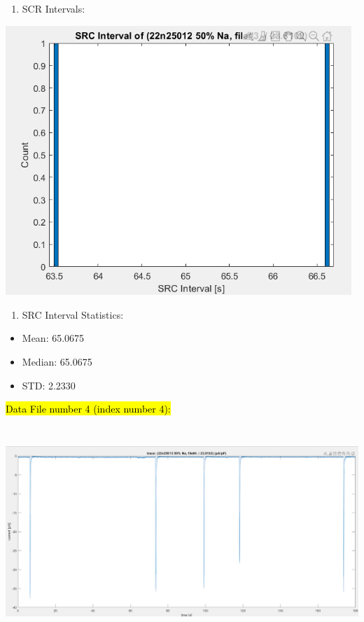\begin{enumerate}
\def\labelenumi{\arabic{enumi}.}
\setcounter{enumi}{3}
\item
  SCR Intervals:
\end{enumerate}

\includegraphics[width=5.14063in,height=4.00581in]{media/image1.png}

\begin{enumerate}
\def\labelenumi{\arabic{enumi}.}
\setcounter{enumi}{4}
\item
  SRC Interval Statistics:
\end{enumerate}

\begin{itemize}
\item
  Mean: 65.0675
\item
  Median: 65.0675
\item
  STD: 2.2330
\end{itemize}

\hl{Data File number 4 (index number 4):}

\includegraphics[width=6.5in,height=3.13889in]{media/image4.png}

